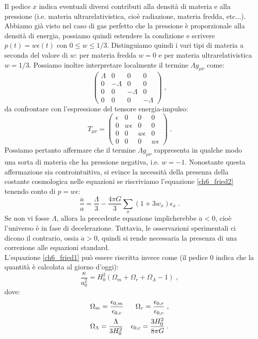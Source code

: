 \documentclass[12pt,a4paper]{report}
\theoremstyle{definition}
\begin{document}
Il pedice $x$ indica eventuali diversi contributi alla densità di materia e alla pressione (i.e. materia ultrarelativistica, cioè radiazione, materia fredda, etc...). Abbiamo già visto nel caso di gas perfetto che la pressione è proporzionale alla densità di energia, possiamo quindi estendere la condizione e scrivere $p(t)=w\epsilon(t)$ con $0\le w\le 1/3$. Distinguiamo quindi i vari tipi di materia a seconda del valore di $w$: per materia fredda $w=0$ e per materia ultrarelativistica $w=1/3$. Possiamo inoltre interpretare localmente il termine $\Lambda g_{\mu\nu}$ come:
$$
\left(\begin{matrix}
\Lambda & 0 & 0 & 0 \\
0 & -\Lambda & 0 & 0 \\
0 & 0 & -\Lambda & 0 \\
0 & 0 & 0 & -\Lambda
\end{matrix}\right)\;,
$$
da confrontare con l'espressione del tensore energia-impulso:
$$
T_{\mu\nu}=\left(\begin{matrix}
\epsilon & 0 & 0 & 0 \\
0 & w\epsilon & 0 & 0 \\
0 & 0 & w\epsilon & 0 \\
0 & 0 & 0 & w\epsilon
\end{matrix}\right)\;.
$$
Possiamo pertanto affermare che il termine $\Lambda g_{\mu\nu}$ rappresenta in qualche modo una sorta di materia che ha pressione negativa, i.e. $w=-1$. Nonostante questa affermazione sia controintuitiva, si evince la necessità della presenza della costante cosmologica nelle equazioni se riscriviamo l'equazione \eqref{ch6_fried2} tenendo conto di $p=w\epsilon$:
\begin{equation}
\frac{\ddot{a}}{a}=\frac{\Lambda}{3}-\frac{4\pi G}{3}\sum_x (1+3w_x)\epsilon_x\;.
\end{equation}
Se non vi fosse $\Lambda$, allora la precedente equazione implicherebbe $\ddot{a}<0$, cioè l'universo è in fase di decelerazione. Tuttavia, le osservazioni sperimentali ci dicono il contrario, ossia $\ddot{a}>0$, quindi si rende necessaria la presenza di una correzione alle equazioni standard. \\
L'equazione \eqref{ch6_fried1} può essere riscritta invece come (il pedice $0$ indica che la quantità è calcolata al giorno d'oggi):
\begin{equation}
\frac{\kappa}{a_0^2}=H_0^2(\Omega_m+\Omega_r+\Omega_{\Lambda}-1)\;, \label{ch6_friedomega}
\end{equation}
dove:
\begin{align}
&\Omega_m=\frac{\epsilon_{0,m}}{\epsilon_{0,c}} &\Omega_r=\frac{\epsilon_{0,r}}{\epsilon_{0,c}} \notag\;, \\
&\Omega_{\Lambda}=\frac{\Lambda}{3H_0^2} &\epsilon_{0,c}=\frac{3H_0^2}{8\pi G}\;.
\end{align}
\end{document}
